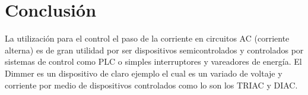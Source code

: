 \documentclass[11pt,a4paper]{article}
\begin{document}
\section{Conclusión}

La utilización para el control el paso de la corriente en circuitos AC (corriente alterna) es de gran utilidad por ser dispositivos semicontrolados y controlados por sistemas  de control como PLC o simples interruptores y vareadores de energía. El Dimmer es un dispositivo de claro ejemplo el cual es un variado de voltaje y corriente por medio de dispositivos controlados como lo son los TRIAC y DIAC.
\end{document}
